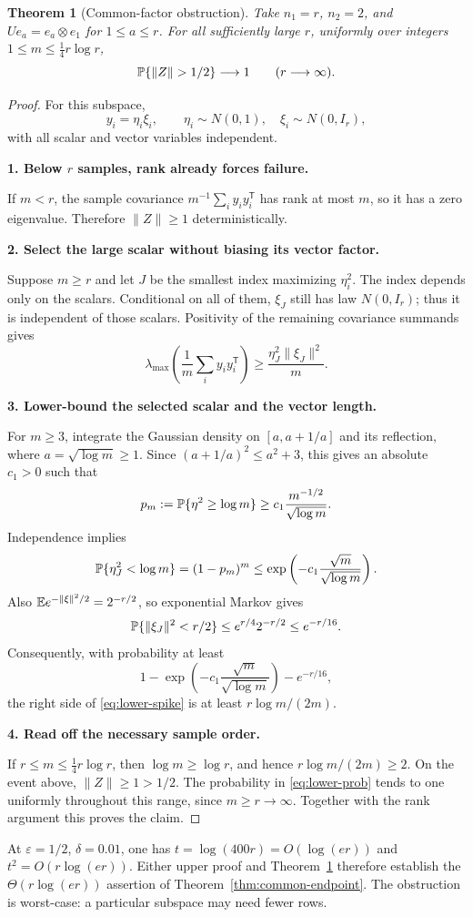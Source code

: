 \documentclass[11pt]{article}
\numberwithin{equation}{section}
\newtheorem{theorem}{Theorem}[section]
\theoremstyle{definition}\newtheorem{definition}[theorem]{Definition}
\theoremstyle{remark}\newtheorem{remark}[theorem]{Remark}
\newcommand{\norm}[1]{\lVert#1\rVert}\newcommand{\ip}[2]{\langle#1,#2\rangle}
\newcommand{\step}[1]{\par\addvspace{.65\baselineskip}\Needspace{4\baselineskip}\noindent\textbf{#1}\par\nobreak\smallskip}
\begin{document}
\begin{theorem}[Common-factor obstruction]\label{thm:lower}
Take $n_1=r$, $n_2=2$, and $Ue_a=e_a\otimes e_1$ for $1\le a\le r$.
For all sufficiently large $r$, uniformly over integers
$1\le m\le\tfrac14r\log r$,
\[
 \Prob\{\norm Z>1/2\}\longrightarrow1\qquad(r\longrightarrow\infty).
\]
\end{theorem}
\begin{proof}
For this subspace,
\[
 y_i=\eta_i\xi_i,\qquad \eta_i\sim N(0,1),\quad\xi_i\sim N(0,I_r),
\]
with all scalar and vector variables independent.

\step{1. Below $r$ samples, rank already forces failure.}
If $m<r$, the sample covariance $m^{-1}\sum_i y_iy_i^{\mathsf T}$ has rank at
most $m$, so it has a zero eigenvalue. Therefore $\norm Z\ge1$ deterministically.

\step{2. Select the large scalar without biasing its vector factor.}
Suppose $m\ge r$ and let $J$ be the smallest index maximizing $\eta_i^2$.
The index depends only on the scalars. Conditional on all of them, $\xi_J$ still
has law $N(0,I_r)$; thus it is independent of those scalars.
Positivity of the remaining covariance summands gives
\begin{equation}\label{eq:lower-spike}
 \lambda_{\max}\left(\frac1m\sum_i y_iy_i^{\mathsf T}\right)
 \ge\frac{\eta_J^2\norm{\xi_J}^2}{m}.
\end{equation}

\step{3. Lower-bound the selected scalar and the vector length.}
For $m\ge3$, integrate the Gaussian density on
$[a,a+1/a]$ and its reflection, where $a=\sqrt{\log m}\ge1$.
Since $(a+1/a)^2\le a^2+3$, this gives an absolute $c_1>0$ such that
\[
 p_m:=\mathbb P\{\eta^2\ge\log m\}
 \ge c_1\frac{m^{-1/2}}{\sqrt{\log m}}.
\]
Independence implies
\[
 \mathbb P\{\eta_J^2<\log m\}=(1-p_m)^m
 \le\exp\left(-c_1\frac{\sqrt m}{\sqrt{\log m}}\right).
\]
Also $\E e^{-\norm\xi^2/2}=2^{-r/2}$, so exponential Markov gives
\[
 \Prob\{\norm{\xi_J}^2<r/2\}
 \le e^{r/4}2^{-r/2}\le e^{-r/16}.
\]
Consequently, with probability at least
\begin{equation}\label{eq:lower-prob}
 1-\exp\left(-c_1\frac{\sqrt m}{\sqrt{\log m}}\right)-e^{-r/16},
\end{equation}
the right side of \eqref{eq:lower-spike} is at least $r\log m/(2m)$.

\step{4. Read off the necessary sample order.}
If $r\le m\le\tfrac14r\log r$, then $\log m\ge\log r$, and hence
$r\log m/(2m)\ge2$. On the event above, $\norm Z\ge1>1/2$.
The probability in \eqref{eq:lower-prob} tends to one uniformly throughout this
range, since $m\ge r\to\infty$. Together with the rank argument this proves the
claim.
\end{proof}
At $\varepsilon=1/2$, $\delta=0.01$, one has
$t=\log(400r)=O(\log(er))$ and $t^2=O(r\log(er))$.
Either upper proof and Theorem~\ref{thm:lower} therefore establish the
$\Theta(r\log(er))$ assertion of Theorem~\ref{thm:common-endpoint}.
The obstruction is worst-case: a particular subspace may need fewer rows.
\end{document}
